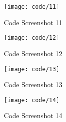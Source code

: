 \begin{figure}[ht]
	\centering
	\texttt{[image: code/11]}
	\caption{Code Screenshot 11}
	\label{fig:code11}
\end{figure}

\begin{figure}[ht]
	\centering
	\texttt{[image: code/12]}
	\caption{Code Screenshot 12}
	\label{fig:code12}
\end{figure}

\begin{figure}[ht]
	\centering
	\texttt{[image: code/13]}
	\caption{Code Screenshot 13}
	\label{fig:code13}
\end{figure}

\begin{figure}[ht]
	\centering
	\texttt{[image: code/14]}
	\caption{Code Screenshot 14}
	\label{fig:code14}
\end{figure}

